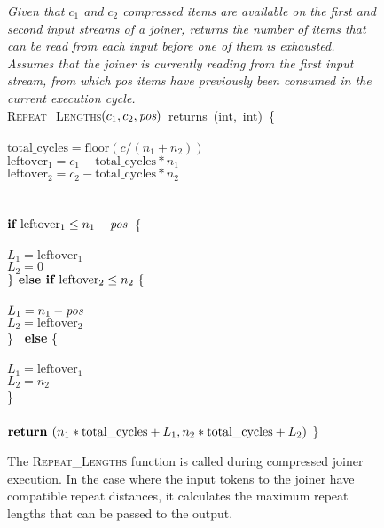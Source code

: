 \begin{figure}[t]
\centering
\begin{minipage}{0.75\textwidth}
{\it Given that $c_1$ and $c_2$ compressed items are available on the
  first and second input streams of a joiner, returns the number of
  items that can be read from each input before one of them is
  exhausted.  Assumes that the joiner is currently reading from the
  first input stream, from which \mbox{pos} items have previously been
  consumed in the current execution cycle.}\\
\textsc{Repeat\_Lengths}$(c_1, c_2, \mbox{\it pos} )$~returns~(int,~int)~\{\\
\\
\tab$\mbox{total\_cycles} = \mbox{floor}(c/(n_1 + n_2))$\\
\tab$\mbox{leftover}_1 = c_1 - \mbox{total\_cycles} * n_1$\\
\tab$\mbox{leftover}_2 = c_2 - \mbox{total\_cycles} * n_2$\\
~ \vspace{-6pt}\\
\\
\tab$\mbox{\bf if~} \mbox{leftover}_1 \leq n_1 - \mbox{\it pos}$~\{\\
\tab{}\\
\tab\tab$L_1 = \mbox{leftover}_1$\\
\tab\tab$L_2 = 0$\\
\tab$\} \mbox{\bf~else if~} \mbox{leftover}_2 \leq n_2~\{$\\
\tab{}\\
\tab\tab$L_1 = n_1-\mbox{\it pos}$\\
\tab\tab$L_2 = \mbox{leftover}_2$\\
\tab\} \mbox{\bf ~else} \{\\
\tab{}\\
\tab\tab$L_1 = \mbox{leftover}_1$\\
\tab\tab$L_2 = n_2$\\
\tab\}\\
~ \vspace{-6pt}\\ 
\tab$\mbox{\bf return~}(n_1*\mbox{total\_cycles} + L_1, n_2*\mbox{total\_cycles} + L_2)$
\}
\end{minipage}
\caption[\textsc{Repeat\_Lengths} function for compressed joiner
  execution]{The \textsc{Repeat\_Lengths} function is called during
  compressed joiner execution.  In the case where the input tokens to
  the joiner have compatible repeat distances, it calculates the
  maximum repeat lengths that can be passed to the
  output.\protect\label{fig:repeat-lengths}}
\end{figure}

